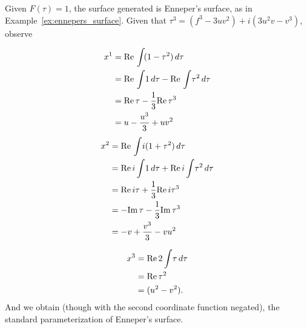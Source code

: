   \begin{ex}
    Given $F(\tau) = 1$, the surface generated is Enneper's surface, as in Example~\ref{ex:ennepers_surface}. Given that $\tau^3 = \left(f^3 - 3uv^2\right) + i\left(3u^2v - v^3\right)$, observe
    \begin{multicols}{2}
      \begin{align*}
        x^1 &= \text{Re}\,\int\!(1 - \tau^2)\,d\tau\\
        &= \text{Re}\,\int\!1\,d\tau - \text{Re}\,\int\!\tau^2\,d\tau\\
        &= \text{Re}\, \tau - \frac{1}{3}\text{Re}\,\tau^3\\
        &= u - \frac{u^3}{3} + uv^2
      \end{align*}\break
      \begin{align*}
        x^2 &= \text{Re}\,\int\!i(1 + \tau^2)\,d\tau\\
        &= \text{Re}\, i\int\!1\,d\tau + \text{Re}\, i\int\!\tau^2\,d\tau\\
        &= \text{Re}\, i\tau + \frac{1}{3}\text{Re}\, i\tau^3\\
        &= -\text{Im}\,\tau - \frac{1}{3}\text{Im}\, \tau^3\\
        &= - v + \frac{v^3}{3} - vu^2
      \end{align*}
    \end{multicols}
    
    \begin{align*}
      x^3 &= \text{Re}\,2\int\!\tau\,d\tau\\
      &= \text{Re}\, \tau^2\\
      &= (u^2 - v^2).
    \end{align*}
    And we obtain (though with the second coordinate function negated), the standard parameterization of Enneper's surface.
  \end{ex}
